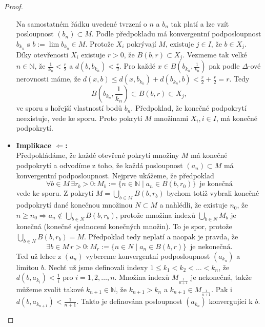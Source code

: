 \documentclass[../main.tex]{subfiles}
\begin{document}
\begin{proof}
\begin{itemize}
{            Na samostatném řádku uvedené tvrzení o $n$ a $b_n$ tak platí a lze vzít posloupnost $(b_n)\subset M$. Podle předpokladu má konvergentní
            podposloupnost $b_{k_n}$ s $b := \lim b_{k_n} \in M$. Protože $X_i$ pokrývají $M$, existuje $j\in I$, že $b\in X_j$.
            Díky otevřenosti $X_i$ existuje $r > 0$, že $B(b,r)\subset X_j$. Vezmeme tak velké $n \in \mathbb{N}$, že $\frac{1}{k_n} < \frac{r}{2}$
            a $d(b,b_{k_n}) < \frac{r}{2}$. Pro každé $x\in B\left(b_{k_n}, \frac{1}{k_n}\right)$ pak podle $\Delta$-ové nerovnosti máme, že
            $d(x,b)\leq d(x,b_{k_n}) + d(b_{k_n}, b) < \frac{r}{2} + \frac{r}{2} = r.$
            Tedy \[ B\left( b_{k_n}, \frac{1}{k_n}\right)  \subset B(b,r) \subset X_j  , \]
            ve sporu s hořejší vlastností bodů $b_n$. Předpoklad, že konečné podpokrytí neexistuje, vede ke sporu.
            Proto pokrytí $M$ množinami $X_i, i\in I$, má konečné podpokrytí.
        }
        \item {
            \textbf{Implikace $\Leftarrow$:}\\
            Předpokládáme, že každé otevřené pokrytí množiny $M$ má konečné podpokrytí a odvodíme z toho, že
            každá posloupnost $(a_n) \subset M$ má konvergentní podposloupnost.
            Nejprve ukážeme, že předpoklad
            \[ \forall b \in M \, \exists r_b > 0: M_b := \{ n\in\mathbb{N}\mid a_n \in B(b,r_0) \} \,\,\,\text{je konečná} \]
            vede ke sporu. Z pokrytí $M = \bigcup_{b\in M} B(b,r_b)$ bychom totiž vybrali konečné podpokrytí dané
            konečnou množinou $N \subset M$ a nahlédli, že existuje $n_0$, že $n\geq n_0 \Rightarrow a_n \notin \bigcup_{b\in N} B(b,r_b)$,
            protože množina indexů $\bigcup_{b\in N}M_b$ je konečná (konečné sjednocení konečných množin). To je spor,
            protože $\bigcup_{b\in N}B(b,r_b) = M$. Předpoklad tedy neplatí a naopak je pravda, že
            \[ \exists b \in M \, r > 0: M_r := \{ n \in N \mid a_n \in B(b,r) \}\,\,\,\text{je nekonečná}. \]
            Teď už lehce z $(a_n)$ vybereme konvergentní podposloupnost $(a_{k_n})$ a limitou $b$. Nechť už jsme definovali
            indexy $1 \leq k_1 < k_2 < \dots < k_n$, že $d(b,a_{k_i}) < \frac{1}{i}$ pro $i = 1,2,\dots,n$. Množina indexů
            $M_{\frac{1}{n+1}}$ je nekonečná, takže můžeme zvolit takové $k_{n+1} \in \mathbb{N}$, že $k_{n+1} > k_n$
            a $k_{n+1} \in M_{\frac{1}{n+1}}$. Pak i $d(b,a_{k_{n+1}}) < \frac{1}{n+1}$. Takto je definována posloupnost
            $(a_{k_n})$ konvergující k $b$.
        }
    \end{itemize}
\end{proof}
\end{document}
